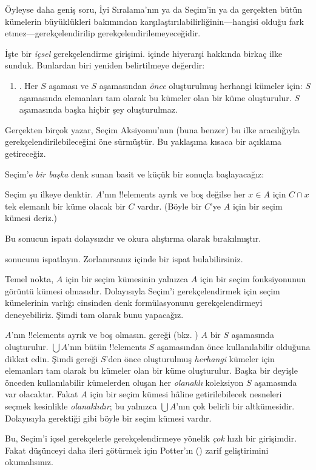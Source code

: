 \documentclass[../../../include/open-logic-section]{subfiles}
\begin{document}

Öyleyse daha geniş soru, İyi Sıralama'nın ya da Seçim'in ya da gerçekten
bütün kümelerin büyüklükleri bakımından karşılaştırılabilirliğinin---hangisi
olduğu fark etmez---gerekçelendirilip gerekçelendirilemeyeceğidir.

İşte bir \emph{içsel} gerekçelendirme girişimi.
 içinde hiyerarşi hakkında birkaç ilke sunduk.
Bunlardan biri yeniden belirtilmeye değerdir:
\begin{enumerate}
	\item[] \stagesacc. Her $S$ aşaması ve $S$ aşamasından \emph{önce}
	oluşturulmuş herhangi kümeler için: $S$ aşamasında elemanları tam olarak
	bu kümeler olan bir küme oluşturulur. $S$ aşamasında başka hiçbir şey
	oluşturulmaz.
\end{enumerate}
Gerçekten birçok yazar, Seçim Aksiyomu'nun (buna benzer) bu ilke
aracılığıyla gerekçelendirilebileceğini öne sürmüştür. Bu yaklaşıma kısaca
bir açıklama getireceğiz.

Seçim'e \emph{bir başka} denk sunan basit ve küçük bir sonuçla başlayacağız:

\begin{thm}[$\ZF$ içinde]
Seçim şu ilkeye denktir. $A$'nın !!{element}s ayrık ve boş değilse her
$x\in A$ için $C\cap x$ tek elemanlı bir küme olacak bir $C$ vardır. (Böyle bir
$C$'ye $A$ için bir {seçim kümesi} deriz.)
\end{thm}

Bu sonucun ispatı dolaysızdır ve okura alıştırma olarak bırakılmıştır.

\begin{prob}
 sonucunu ispatlayın.
Zorlanırsanız \cite[pp.~242--3]{Potter2004} içinde bir ispat bulabilirsiniz.
\end{prob}

Temel nokta, $A$ için bir seçim kümesinin yalnızca $A$ için bir seçim
fonksiyonunun görüntü kümesi olmasıdır. Dolayısıyla Seçim'i gerekçelendirmek
için seçim kümelerinin varlığı cinsinden denk formülasyonunu
gerekçelendirmeyi deneyebiliriz. Şimdi tam olarak bunu yapacağız.

$A$'nın !!{element}s ayrık ve boş olmasın. \stageshier{} gereği
(bkz. ) $A$ bir $S$ aşamasında oluşturulur.
$\bigcup A$'nın bütün !!{element}s $S$ aşamasından önce kullanılabilir
olduğuna dikkat edin. Şimdi \stagesacc{} gereği $S$'den önce oluşturulmuş
\emph{herhangi} kümeler için elemanları tam olarak bu kümeler olan bir küme
oluşturulur. Başka bir deyişle önceden kullanılabilir kümelerden oluşan
her \emph{olanaklı} koleksiyon $S$ aşamasında var olacaktır. Fakat $A$ için
bir seçim kümesi hâline getirilebilecek nesneleri seçmek kesinlikle
\emph{olanaklıdır}; bu yalnızca $\bigcup A$'nın çok belirli bir altkümesidir.
Dolayısıyla gerektiği gibi böyle bir seçim kümesi vardır.

Bu, Seçim'i içsel gerekçelerle gerekçelendirmeye yönelik \emph{çok} hızlı
bir girişimdir. Fakat düşünceyi daha ileri götürmek için Potter'ın
(\citeyear[\S14.8]{Potter2004}) zarif geliştirimini okumalısınız.
\end{document}
